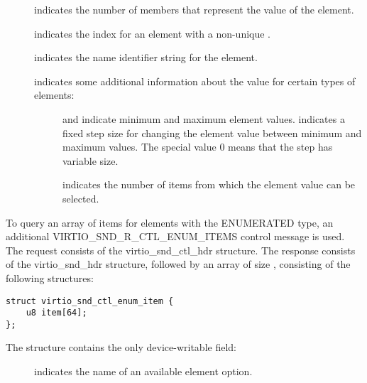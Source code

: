 \begin{description}
\item[] indicates the number of  members that represent
the value of the element.
\item[] indicates the index for an element with a non-unique .
\item[] indicates the name identifier string for the element.
\item[] indicates some additional information about the value for
certain types of elements:
\begin{description}
\item[]
\item[]  and  indicate minimum and maximum
element values.  indicates a fixed step size for changing the element
value between minimum and maximum values. The special value 0 means that the step
has variable size.
\item[]  indicates the number of items from which
the element value can be selected.
\end{description}
\end{description}

To query an array of items for elements with the ENUMERATED type, an additional
VIRTIO_SND_R_CTL_ENUM_ITEMS control message is used. The request consists of the
virtio_snd_ctl_hdr structure. The response consists of the virtio_snd_hdr structure,
followed by an array of size , consisting of the following
structures:

\begin{lstlisting}
struct virtio_snd_ctl_enum_item {
    u8 item[64];
};
\end{lstlisting}

The structure contains the only device-writable field:

\begin{description}
\item[] indicates the name of an available element option.
\end{description}


